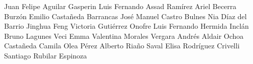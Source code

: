 Juan Felipe Aguilar Gasperin
Luis Fernando Assad Ramírez
Ariel Becerra Burzón
Emilio Castañeda Barrancas
José Manuel Castro Bulnes
Nia Díaz del Barrio
Jinghua Feng
Victoria Gutiérrez Onofre
Luis Fernando Hermida Inclán
Bruno Lagunes Veci
Emma Valentina Morales Vergara
Andrés Aldair Ochoa Castañeda
Camila Olea Pérez
Alberto Riaño Saval
Elisa Rodríguez Crivelli
Santiago Rubilar Espinoza